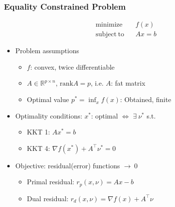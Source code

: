 \subsubsection*{Equality Constrained Problem}
\begin{equation}\begin{aligned}
    \mathrm{minimize}~~&~~f(x) \\
    \mathrm{subject~to}~~&~~Ax=b
\end{aligned}\end{equation}
\begin{itemize}
    \item Problem assumptions
    \begin{itemize}
        \item $f$: convex, twice differentiable
        \item $A\in\mathbb{R}^{p\times n}$, $\mathrm{rank}A=p$, i.e. $A$: fat matrix
        \item Optimal value $p^\ast = \inf_x f(x)$: Obtained, finite
    \end{itemize}
    \newpage
    \item Optimality conditions: $x^\ast$: optimal $\Leftrightarrow$ $\exists~\nu^\ast$ s.t.
    \begin{itemize}
        \item KKT 1: $Ax^\ast=b$
        \item KKT 4: $\nabla f(x^\ast)+A^{\top}\nu^\ast=0$
    \end{itemize}
    \item Objective: residual(error) functions $\rightarrow~0$
    \begin{itemize}
        \item Primal residual: $r_p(x,\nu)=Ax-b$
        \item Dual residual: $r_d(x,\nu)=\nabla f(x)+A^{\top}\nu$
    \end{itemize}
\end{itemize}

